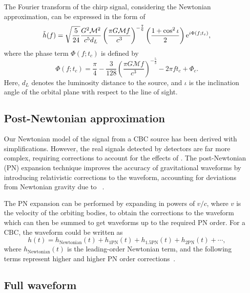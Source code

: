 The Fourier transform of the chirp signal, considering the Newtonian approximation, can be expressed in the form of
%
\begin{equation}
    \Tilde{h}(f) = \sqrt{\frac{5}{24}} \frac{G^2 \mathcal{M}^2}{c^5 d_L} \left(\frac{\pi G \mathcal{M} f}{c^3}\right)^{-\frac{7}{6}} \left(\frac{1 + \cos^2 \iota}{2}\right) {\rm e}^{i \Phi(f; t_c)},
\end{equation}
%
where the phase term \( \Phi(f; t_c) \) is defined by
%
\begin{equation}
    \Phi(f; t_c) = \frac{\pi}{4} - \frac{3}{128} \left(\frac{\pi G \mathcal{M} f}{c^3}\right)^{-\frac{5}{3}} - 2\pi f t_c + \Phi_c.
\end{equation}
%
Here, \( d_L \) denotes the luminosity distance to the source, and \( \iota \) is the inclination angle of the orbital plane with respect to the line of sight.

\subsection{\label{1:sec:post_newtonian_treatment}Post-Newtonian approximation}

Our Newtonian model of the \gwadj signal from a CBC source has been derived with simplifications. However, the real signals detected by \gwadj detectors are far more complex, requiring corrections to account for the effects of \GR. The post-Newtonian (PN) expansion technique improves the accuracy of gravitational waveforms by introducing relativistic corrections to the waveform, accounting for deviations from Newtonian gravity due to \GR~\cite{2PN_1:1996, 2PN_2:1996, 2PN_3:1995}.

The PN expansion can be performed by expanding in powers of \( v/c \), where \( v \) is the velocity of the orbiting bodies, to obtain the corrections to the waveform which can then be summed to get waveforms up to the required PN order. For a CBC, the waveform could be written as
%
\begin{equation}
    h(t) = h_{\text{Newtonian}}(t) + h_{\text{1PN}}(t) + h_{\text{1.5PN}}(t) + h_{\text{2PN}}(t) + \cdots,
\end{equation}
%
where \( h_{\text{Newtonian}}(t) \) is the leading-order Newtonian term, and the following terms represent higher and higher PN order corrections~\cite{PN_models:2009}.

\subsection{\label{1:sec:full_waveform}Full waveform}

